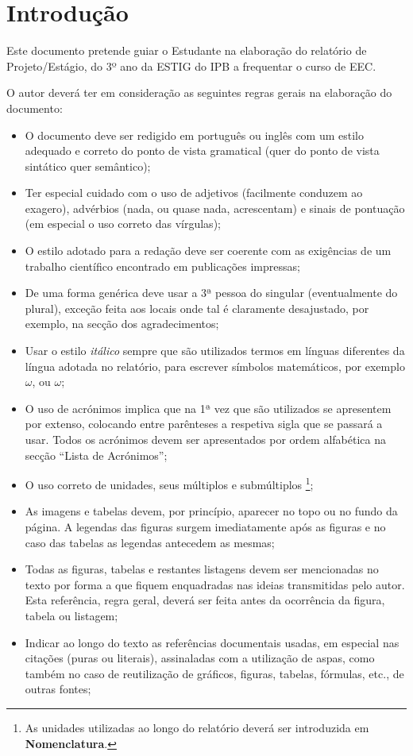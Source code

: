 \chapter{Introdução}\label{cap1}

Este documento pretende guiar o Estudante na elaboração do relatório de Projeto/Estágio, do 3º ano da \gls{ESTIG} do \gls{IPB} a frequentar o curso de \gls{EEC}.\par
O autor deverá ter em consideração as seguintes regras gerais na elaboração do documento:
\begin{itemize}
	\item O documento deve ser redigido em português ou inglês com um estilo adequado e correto do ponto de vista gramatical (quer do ponto de vista sintático quer semântico);
	\item Ter especial cuidado com o uso de adjetivos (facilmente conduzem ao exagero), advérbios (nada, ou quase nada, acrescentam) e sinais de pontuação (em especial o uso correto das vírgulas);
	\item O estilo adotado para a redação deve ser coerente com as exigências de um trabalho científico encontrado em publicações impressas;
	\item De uma forma genérica deve usar a 3ª pessoa do singular (eventualmente do plural), exceção feita aos locais onde tal \'e claramente desajustado, por exemplo, na secção dos agradecimentos;
	\item Usar o estilo \textit{it\'{a}lico} sempre que s\~ao utilizados termos em l{\'i}nguas diferentes da l{\'i}ngua adotada no relat{\'o}rio, para escrever símbolos matemáticos, por exemplo $\omega$, ou \textit{$\omega$};
	\item O uso de acr\'onimos implica que na 1ª vez que são utilizados se apresentem por extenso, colocando entre parênteses a respetiva sigla que se passará a usar. Todos os acrónimos devem ser apresentados por ordem alfabética na secção ``Lista de Acrónimos'';
    	\item O uso correto de unidades, seus múltiplos e submúltiplos \footnote{As unidades utilizadas ao longo do relatório deverá ser introduzida em \textbf{Nomenclatura}.};
	\item As imagens e tabelas devem, por princípio, aparecer no topo ou no fundo da página. A legendas  das figuras surgem imediatamente após as figuras e no caso das tabelas as legendas antecedem as mesmas;
	\item Todas as figuras, tabelas e restantes listagens devem ser mencionadas no texto por forma a que fiquem enquadradas nas ideias transmitidas pelo autor. Esta referência, regra geral, deverá ser feita antes da ocorrência da figura, tabela ou listagem;
	\item Indicar ao longo do texto as referências documentais usadas, em especial nas citações (puras ou literais), assinaladas com a utilização de aspas, como também no caso de reutilização de gráficos, figuras, tabelas, fórmulas, etc., de outras fontes;
\end{itemize}

